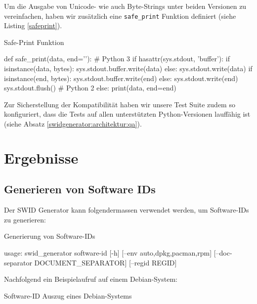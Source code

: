 Um die Ausgabe von Unicode- wie auch Byte-Strings unter beiden Versionen zu
vereinfachen, haben wir zusätzlich eine \texttt{safe\_print} Funktion definiert
(siehe Listing \ref{safeprint}).

\begin{listing}[h]
\caption{Safe-Print Funktion}
\label{safeprint}
\begin{pythoncode}
def safe_print(data, end='\n'):
    # Python 3
    if hasattr(sys.stdout, 'buffer'):
        if isinstance(data, bytes):
            sys.stdout.buffer.write(data)
        else:
            sys.stdout.write(data)
        if isinstance(end, bytes):
            sys.stdout.buffer.write(end)
        else:
            sys.stdout.write(end)
        sys.stdout.flush()
    # Python 2
    else:
        print(data, end=end)
\end{pythoncode}
\end{listing}

Zur Sicherstellung der Kompatibilität haben wir unsere Test Suite zudem so
konfiguriert, dass die Tests auf allen unterstützten Python-Versionen lauffähig
ist (siehe Absatz \ref{swidgenerator:architektur:qa}).


\section{Ergebnisse}

\subsection{Generieren von Software IDs}

Der SWID Generator kann folgendermassen verwendet werden, um Software-IDs zu
generieren:

\begin{listing}[H]
\caption{Generierung von Software-IDs}
\begin{textcode}
usage: swid_generator software-id [-h] [--env {auto,dpkg,pacman,rpm}]
                                  [--doc-separator DOCUMENT_SEPARATOR]
                                  [--regid REGID]
\end{textcode}
\end{listing}

Nachfolgend ein Beispielaufruf auf einem Debian-System:

\begin{listing}[H]
\caption{Software-ID Auszug eines Debian-Systems}
\end{listing}

